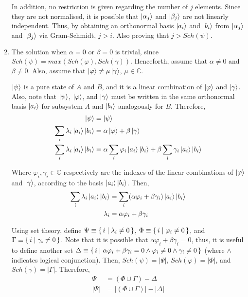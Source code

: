 \begin{enumerate}
    In addition, no restriction is given regarding the number of $j$ elements.
    Since they are not normalised, it is possible that
    $\ket{\alpha_j}$ and $\ket{\beta_j}$ are not linearly independent.
    Thus, by obtaining an orthonormal basis $\ket{a_i}$ and $\ket{b_i}$ from
    $\ket{\alpha_j}$ and $\ket{\beta_j}$ via Gram-Schmidt, $j > i$.
    Also proving that $j > Sch(\psi)$.
    
    \dotfill
    
    \item The solution when $\alpha = 0$ or $\beta = 0$ is trivial,
    since $Sch(\psi) = max(Sch(\varphi), Sch(\gamma))$.
    Henceforth, assume that $\alpha \neq 0$ and $\beta \neq 0$.
    Also, assume that $\ket{\varphi} \neq \mu \ket{\gamma}$,
    $\mu \in \mathbb{C}$.
    
    $\ket{\psi}$ is a pure state of $A$ and $B$,
    and it is a linear combination of $\ket{\varphi}$ and $\ket{\gamma}$.
    Also, note that $\ket{\psi}$, $\ket{\varphi}$, and $\ket{\gamma}$
    must be written in the same orthonormal basis
    $\ket{a_i}$ for subsystem $A$ and $\ket{b_i}$ analogously for $B$.
    Therefore,
    \begin{align}
        \ket{\psi} &= \ket{\psi} \\
        \sum_i \lambda_i \ket{a_i} \ket{b_i} &= \alpha \ket{\varphi} + \beta \ket{\gamma} \\
        \sum_i \lambda_i \ket{a_i} \ket{b_i} &=
            \alpha \sum_i \varphi_i \ket{a_i} \ket{b_i} + \beta \sum_i \gamma_i \ket{a_i} \ket{b_i} \\
    \end{align}
    
    Where $\varphi_i, \gamma_i \in \mathbb{C}$ respectively are the indexes of the linear combinations
    of $\ket{\varphi}$ and $\ket{\gamma}$, according to the basis $\ket{a_i} \ket{b_i}$.
    Then,
    \begin{align}
        \sum_i \lambda_i \ket{a_i} \ket{b_i} &=
            \sum_i (\alpha \varphi_i + \beta \gamma_i) \ket{a_i} \ket{b_i} \\
        \lambda_i &= \alpha \varphi_i + \beta \gamma_i
    \end{align}
    
    Using set theory, define $\Psi \equiv \set{i \mid \lambda_i \neq 0}$,
    $\Phi \equiv \set{i \mid \varphi_i \neq 0}$, and
    $\Gamma \equiv \set{i \mid \gamma_i \neq 0}$.
    Note that it is possible that $\alpha \varphi_i + \beta \gamma_i = 0$,
    thus, it is useful to define another set
    $\Delta \equiv \set{i \mid \alpha \varphi_i + \beta \gamma_i = 0
    \land \varphi_i \neq 0 \land \gamma_i \neq 0}$
    (where $\land$ indicates logical conjunction).
    Then, $Sch(\psi) = |\Psi|$, $Sch(\varphi) = |\Phi|$, and $Sch(\gamma) = |\Gamma|$.
    Therefore,
    \begin{align}
        \Psi &= (\Phi \cup \Gamma) - \Delta \\
        |\Psi| &= |(\Phi \cup \Gamma)| - |\Delta|
    \end{align}
    

\end{enumerate}
